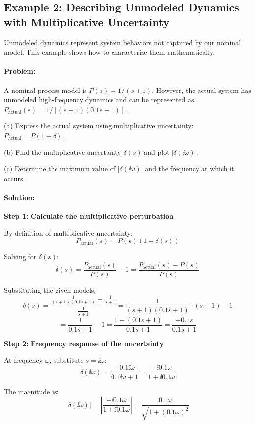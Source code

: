 \documentclass[11pt,a4paper]{article}
\begin{document}
\subsection{Example 2: Describing Unmodeled Dynamics with Multiplicative Uncertainty}

Unmodeled dynamics represent system behaviors not captured by our nominal model. This example shows how to characterize them mathematically.

\paragraph{Problem:}
A nominal process model is $P(s) = 1/(s+1)$. However, the actual system has unmodeled high-frequency dynamics and can be represented as $P_{\text{actual}}(s) = 1/[(s+1)(0.1s+1)]$.

(a) Express the actual system using multiplicative uncertainty: $P_{\text{actual}} = P(1 + \delta)$.

(b) Find the multiplicative uncertainty $\delta(s)$ and plot $|\delta(\ii\omega)|$.

(c) Determine the maximum value of $|\delta(\ii\omega)|$ and the frequency at which it occurs.

\paragraph{Solution:}

\textbf{Step 1: Calculate the multiplicative perturbation}

By definition of multiplicative uncertainty:
\[
P_{\text{actual}}(s) = P(s)(1 + \delta(s))
\]

Solving for $\delta(s)$:
\[
\delta(s) = \frac{P_{\text{actual}}(s)}{P(s)} - 1 = \frac{P_{\text{actual}}(s) - P(s)}{P(s)}
\]

Substituting the given models:
\[
\delta(s) = \frac{\frac{1}{(s+1)(0.1s+1)} - \frac{1}{s+1}}{\frac{1}{s+1}} = \frac{1}{(s+1)(0.1s+1)} \cdot (s+1) - 1
\]
\[
= \frac{1}{0.1s+1} - 1 = \frac{1 - (0.1s+1)}{0.1s+1} = \frac{-0.1s}{0.1s+1}
\]

\textbf{Step 2: Frequency response of the uncertainty}

At frequency $\omega$, substitute $s = \ii\omega$:
\[
\delta(\ii\omega) = \frac{-0.1\ii\omega}{0.1\ii\omega + 1} = \frac{-\ii 0.1\omega}{1 + \ii 0.1\omega}
\]

The magnitude is:
\[
|\delta(\ii\omega)| = \left|\frac{-\ii 0.1\omega}{1 + \ii 0.1\omega}\right| = \frac{0.1\omega}{\sqrt{1 + (0.1\omega)^2}}
\]
\end{document}
